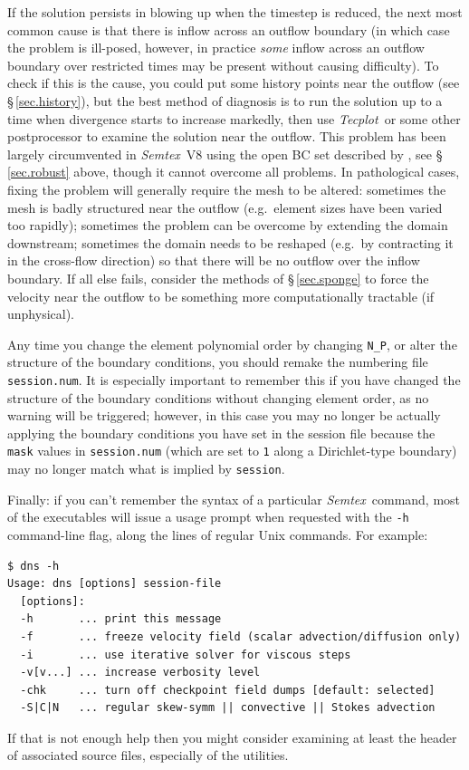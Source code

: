 \documentclass[11pt]{report}
\newcommand{\Semtex}{\emph{Semtex}} \newcommand{\Dog}{\emph{Dog}}
\newcommand{\Tecplot}{\emph{Tecplot}}
\newcommand{\eg}{e.g.\ } \newcommand{\CC}{\mathrm{c.c.}}
\begin{document}
If the solution persists in blowing up when the timestep is reduced,
the next most common cause is that there is inflow across an outflow
boundary (in which case the problem is ill-posed, however, in practice
\emph{some} inflow across an outflow boundary over restricted times
may be present without causing difficulty). To check if this is the
cause, you could put some history points near the outflow (see
\S\,\ref{sec.history}), but the best method of diagnosis is to run the
solution up to a time when divergence starts to increase markedly,
then use \Tecplot\ or some other postprocessor to examine the solution
near the outflow.  This problem has been largely circumvented in
\Semtex~V8 using the open BC set described by \citet{dong15}, see
\S\,\ref{sec.robust} above, though it cannot overcome all problems.
In pathological cases, fixing the problem will generally require the
mesh to be altered: sometimes the mesh is badly structured near the
outflow (\eg element sizes have been varied too rapidly); sometimes
the problem can be overcome by extending the domain downstream;
sometimes the domain needs to be reshaped (\eg by contracting it in
the cross-flow direction) so that there will be no outflow over the
inflow boundary. If all else fails, consider the methods of
\S\,\ref{sec.sponge} to force the velocity near the outflow to be
something more computationally tractable (if unphysical).

Any time you change the element polynomial order by changing
\verb+N_P+, or alter the structure of the boundary conditions, you
should remake the numbering file \verb+session.num+. It is especially
important to remember this if you have changed the structure of the
boundary conditions without changing element order, as no warning will
be triggered; however, in this case you may no longer be actually
applying the boundary conditions you have set in the session file
because the \verb+mask+ values in \texttt{session.num} (which are set
to \verb+1+ along a Dirichlet-type boundary) may no longer match what
is implied by \texttt{session}.

Finally: if you can't remember the syntax of a particular
\Semtex\ command, most of the executables will issue a usage prompt
when requested with the \verb|-h| command-line flag, along the lines
of regular Unix commands.  For example:
%
{\small
\begin{verbatim}
$ dns -h
Usage: dns [options] session-file
  [options]:
  -h       ... print this message
  -f       ... freeze velocity field (scalar advection/diffusion only)
  -i       ... use iterative solver for viscous steps
  -v[v...] ... increase verbosity level
  -chk     ... turn off checkpoint field dumps [default: selected]
  -S|C|N   ... regular skew-symm || convective || Stokes advection
\end{verbatim}
}
%
\noindent
If that is not enough help then you might consider examining at least
the header of associated source files, especially of the utilities.
\end{document}
